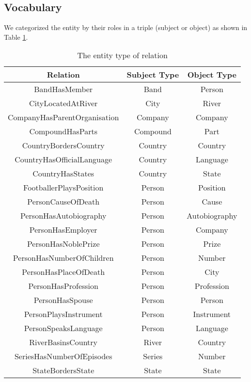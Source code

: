 \documentclass[]{ceurart}
\begin{document}
\subsection{Vocabulary}
We categorized the entity by their roles in a triple (subject or object) as shown in Table \ref{tab-schema}. 
\begin{table}
\caption{The entity type of relation}\label{tab-schema}
\begin{tabular}{|c|c|c|}
\hline
Relation & Subject Type & Object Type \\
\hline
BandHasMember & Band & Person \\
CityLocatedAtRiver & City & River  \\
CompanyHasParentOrganisation & Company & Company \\
CompoundHasParts & Compound & Part\\
CountryBordersCountry & Country & Country\\
CountryHasOfficialLanguage & Country & Language\\
CountryHasStates & Country & State\\
FootballerPlaysPosition & Person & Position\\
PersonCauseOfDeath & Person & Cause\\
PersonHasAutobiography & Person & Autobiography\\
PersonHasEmployer & Person & Company\\
PersonHasNoblePrize & Person & Prize\\
PersonHasNumberOfChildren & Person & Number\\
PersonHasPlaceOfDeath & Person & City\\
PersonHasProfession & Person & Profession\\
PersonHasSpouse & Person & Person\\
PersonPlaysInstrument & Person & Instrument\\
PersonSpeaksLanguage & Person & Language\\
RiverBasinsCountry & River & Country\\
SeriesHasNumberOfEpisodes & Series & Number\\
StateBordersState & State & State\\
\hline
\end{tabular}
\end{table}
\end{document}
